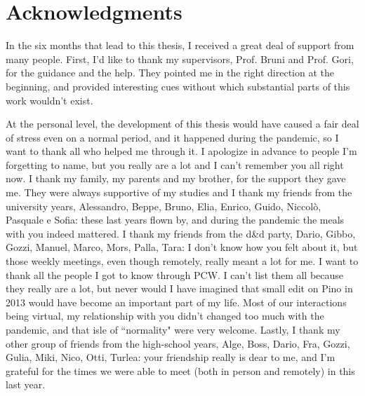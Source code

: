 \section*{Acknowledgments}
In the six months that lead to this thesis, I received a great deal of support from many people.
First, I'd like to thank my supervisors, Prof. Bruni and Prof. Gori, for the guidance and the help. They pointed me in the right direction at the beginning, and provided interesting cues without which substantial parts of this work wouldn't exist.

At the personal level, the development of this thesis would have caused a fair deal of stress even on a normal period, and it happened during the pandemic, so I want to thank all who helped me through it. I apologize in advance to people I'm forgetting to name, but you really are a lot and I can't remember you all right now.
I thank my family, my parents and my brother, for the support they gave me. They were always supportive of my studies and
I thank my friends from the university years, Alessandro, Beppe, Bruno, Elia, Enrico, Guido, Niccolò, Pasquale e Sofia: these last years flown by, and during the pandemic the meals with you indeed mattered.
I thank my friends from the d\&d party, Dario, Gibbo, Gozzi, Manuel, Marco, Mors, Palla, Tara: I don't know how you felt about it, but those weekly meetings, even though remotely, really meant a lot for me.
I want to thank all the people I got to know through PCW. I can't list them all because they really are a lot, but never would I have imagined that small edit on Pino in 2013 would have become an important part of my life. Most of our interactions being virtual, my relationship with you didn't changed too much with the pandemic, and that isle of ``normality" were very welcome.
Lastly, I thank my other group of friends from the high-school years, Alge, Boss, Dario, Fra, Gozzi, Gulia, Miki, Nico, Otti, Turlea: your friendship really is dear to me, and I'm grateful for the times we were able to meet (both in person and remotely) in this last year.
